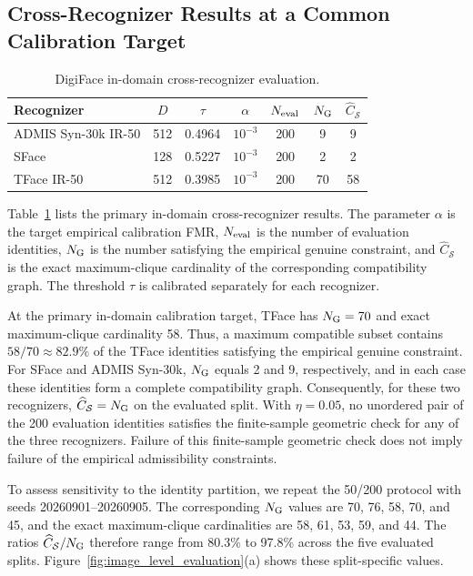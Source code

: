 \documentclass[journal]{IEEEtran}
\begin{document}
\begin{bibunit}
\subsection{Cross-Recognizer Results at a Common Calibration Target}

\begin{table}[!b]
\centering
\caption{DigiFace in-domain cross-recognizer evaluation.}
\label{tab:real_pipeline_summary}
\footnotesize
\setlength{\tabcolsep}{3.8pt}
\begin{tabular}{@{}lcccccc@{}}
\toprule
Recognizer
& $D$
& $\tau$
& $\alpha$
& $N_{\rm eval}$
& $N_{\rm G}$
& $\widehat C_{\mathcal S}$ \\
\midrule
ADMIS Syn-30k IR-50
& 512 & 0.4964 & $10^{-3}$ & 200 & 9 & 9 \\
SFace
& 128 & 0.5227 & $10^{-3}$ & 200 & 2 & 2 \\
TFace IR-50
& 512 & 0.3985 & $10^{-3}$ & 200 & 70 & 58 \\
\bottomrule
\end{tabular}
\end{table}

Table~\ref{tab:real_pipeline_summary} lists the primary in-domain cross-recognizer results. The parameter $\alpha$ is the target empirical calibration FMR, $N_{\rm eval}$ is the number of evaluation identities, $N_{\rm G}$ is the number satisfying the empirical genuine constraint, and $\widehat C_{\mathcal S}$ is the exact maximum-clique cardinality of the corresponding compatibility graph. The threshold $\tau$ is calibrated separately for each recognizer.

At the primary in-domain calibration target, TFace has $N_{\rm G}=70$ and exact maximum-clique cardinality 58. Thus, a maximum compatible subset contains $58/70\approx82.9\%$ of the TFace identities satisfying the empirical genuine constraint. For SFace and ADMIS Syn-30k, $N_{\rm G}$ equals 2 and 9, respectively, and in each case these identities form a complete compatibility graph. Consequently, for these two recognizers, $\widehat C_{\mathcal S}=N_{\rm G}$ on the evaluated split. With $\eta=0.05$, no unordered pair of the 200 evaluation identities satisfies the finite-sample geometric check for any of the three recognizers. Failure of this finite-sample geometric check does not imply failure of the empirical admissibility constraints.


To assess sensitivity to the identity partition, we repeat the 50/200 protocol with seeds 20260901--20260905. The corresponding $N_{\rm G}$ values are 70, 76, 58, 70, and 45, and the exact maximum-clique cardinalities are 58, 61, 53, 59, and 44. The ratios $\widehat C_{\mathcal S}/N_{\rm G}$ therefore range from 80.3\% to 97.8\% across the five evaluated splits. Figure~\ref{fig:image_level_evaluation}(a) shows these split-specific values.






\end{bibunit}
\end{document}
